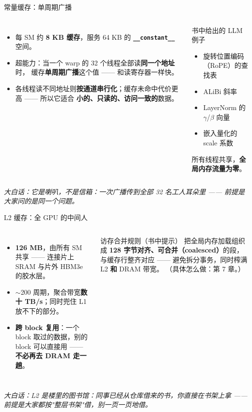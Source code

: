 \documentclass[aspectratio=169]{beamer}
\newcommand{\kw}[1]{\textbf{\textcolor{kwblue}{#1}}}
\newcommand{\pe}[1]{{\footnotesize\itshape 大白话：#1}}
\begin{document}
\begin{frame}{常量缓存：单周期广播}
  \begin{columns}[t]
    \begin{itemize}
      \item 每 SM 约 \kw{8 KB 缓存}，服务 64 KB 的 \kw{\texttt{\_\_constant\_\_}} 空间。
      \item 超能力：当一个 warp 的 32 个线程全部读\kw{同一个地址}时，
            缓存\kw{单周期广播}这个值 —— 和读寄存器一样快。
      \item 各线程读不同地址则\kw{按通道串行化}；缓存未命中代价更高 —— 所以它适合
            \kw{小的、只读的、访问一致的}数据。
    \end{itemize}
    \begin{exampleblock}{书中给出的 LLM 例子}
      \begin{itemize}\small
        \item 旋转位置编码（RoPE）的查找表
        \item ALiBi 斜率
        \item LayerNorm 的 $\gamma$/$\beta$ 向量
        \item 嵌入量化的 scale 系数
      \end{itemize}
      \smallskip
      {\small 所有线程共享，\kw{全局内存流量为零}。}
    \end{exampleblock}
  \end{columns}
  \medskip
  \pe{它是喇叭，不是信箱：一次广播传到全部 32 名工人耳朵里 —— 前提是大家问的是同一个问题。}
\end{frame}

\begin{frame}{L2 缓存：全 GPU 的中间人}
  \begin{columns}[t]
    \begin{itemize}
      \item \kw{126 MB}，由所有 SM 共享 —— 连接片上 SRAM 与片外 HBM3e 的胶水层。
      \item $\sim$200 周期，聚合带宽\kw{数十 TB/s}；同时兜住 L1 放不下的部分。
      \item \kw{跨 block 复用}：一个 block 取过的数据，别的 block 可以直接用
            —— \kw{不必再去 DRAM 走一趟}。
    \end{itemize}
    \begin{block}{访存合并规则（书中提示）}
      \small 把全局内存加载组织成 \kw{128 字节对齐、可合并（coalesced）}的段，
      与缓存行整齐对应 —— 避免拆分事务，同时榨满 L2 \kw{和} DRAM 带宽。
      （具体怎么做：第 7 章。）
    \end{block}
  \end{columns}
  \medskip
  \pe{L2 是楼里的图书馆：同事已经从仓库借来的书，你直接在书架上拿 —— 前提是大家都按"整层书架"借，别一页一页地借。}
\end{frame}
\end{document}
